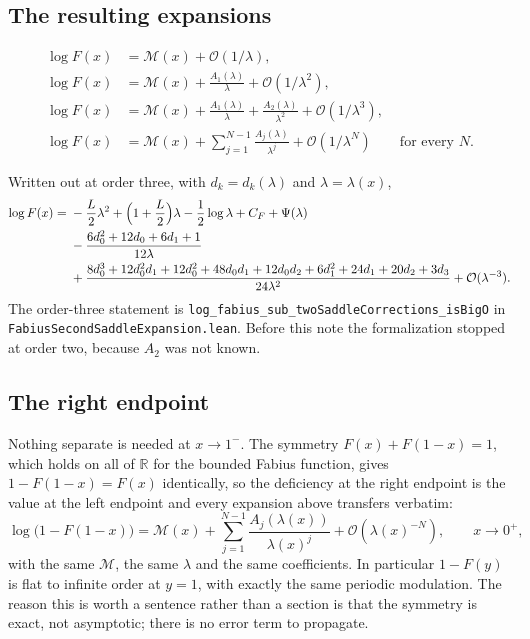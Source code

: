 \documentclass[11pt,oneside]{article}
\theoremstyle{definition}
\theoremstyle{remark}
\newcommand{\R}{\mathbb R}
\newcommand{\bigO}{\mathcal O}
\begin{document}
\subsection{The resulting expansions}

\[
\begin{aligned}
  \log F(x)&=\mathcal M(x)+\bigO(1/\lambda),\\
  \log F(x)&=\mathcal M(x)+\frac{A_1(\lambda)}{\lambda}+\bigO(1/\lambda^2),\\
  \log F(x)&=\mathcal M(x)+\frac{A_1(\lambda)}{\lambda}
    +\frac{A_2(\lambda)}{\lambda^2}+\bigO(1/\lambda^3),\\
  \log F(x)&=\mathcal M(x)+\sum_{j=1}^{N-1}\frac{A_j(\lambda)}{\lambda^j}
    +\bigO(1/\lambda^N)\qquad\text{for every }N.
\end{aligned}
\]

Written out at order three, with $d_k=d_k(\lambda)$ and $\lambda=\lambda(x)$,
\[
\begin{aligned}
  \log F(x)={}&-\frac L2\lambda^2+\Bigl(1+\frac L2\Bigr)\lambda
    -\frac12\log\lambda+C_F+\Psi(\lambda)\\
   &-\frac{6d_0^2+12d_0+6d_1+1}{12\lambda}\\
   &+\frac{8d_0^3+12d_0^2d_1+12d_0^2+48d_0d_1+12d_0d_2
      +6d_1^2+24d_1+20d_2+3d_3}{24\lambda^2}
    +\bigO(\lambda^{-3}).
\end{aligned}
\]
The order-three statement is
\texttt{log\_fabius\_sub\_twoSaddleCorrections\_isBigO} in
\nolinkurl{FabiusSecondSaddleExpansion.lean}.  Before this note the
formalization stopped at order two, because $A_2$ was not known.

\subsection{The right endpoint}\label{smallarg:sec:right}

Nothing separate is needed at $x\to1^-$.  The symmetry $F(x)+F(1-x)=1$,
which holds on all of $\R$ for the bounded Fabius function, gives
$1-F(1-x)=F(x)$ identically, so the deficiency at the right endpoint is the
value at the left endpoint and every expansion above transfers verbatim:
\[
  \log\bigl(1-F(1-x)\bigr)=\mathcal M(x)
    +\sum_{j=1}^{N-1}\frac{A_j(\lambda(x))}{\lambda(x)^j}
    +\bigO(\lambda(x)^{-N}),\qquad x\to0^+,
\]
with the same $\mathcal M$, the same $\lambda$ and the same coefficients.
In particular $1-F(y)$ is flat to infinite order at $y=1$, with exactly the
same periodic modulation.  The reason this is worth a sentence rather than a
section is that the symmetry is exact, not asymptotic; there is no error term
to propagate.
\end{document}
